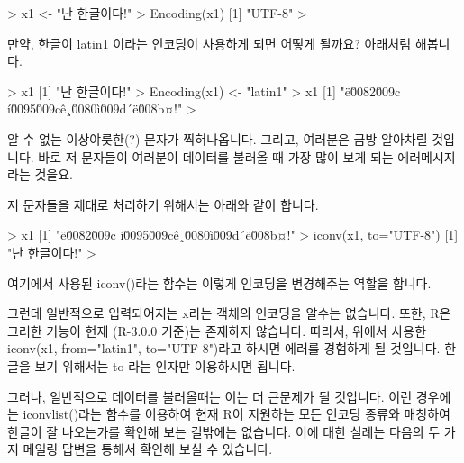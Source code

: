 \begin{Schunk}
\begin{Soutput}
> x1 <- "난 한글이다!"
> Encoding(x1)
[1] "UTF-8"
> 
\end{Soutput}
\end{Schunk}

만약, 한글이 latin1 이라는 인코딩이 사용하게 되면 어떻게 될까요? 
아래처럼 해봅니다.

\begin{Schunk}
\begin{Soutput}
> x1
[1] "난 한글이다!"
> Encoding(x1) <- "latin1"
> x1
[1] "ë\u0082\u009c í\u0095\u009cê¸\u0080ì\u009d´ë\u008b¤!"
> 
\end{Soutput}
\end{Schunk}

알 수 없는 이상야릇한(?) 문자가 찍혀나옵니다. 
그리고, 여러분은 금방 알아차릴 것입니다.
바로 저 문자들이 여러분이 데이터를 불러올 때 가장 많이 보게 되는 에러메시지라는 것을요.

저 문자들을 제대로 처리하기 위해서는 아래와 같이 합니다. 
\begin{Schunk}
\begin{Soutput}
> x1
[1] "ë\u0082\u009c í\u0095\u009cê¸\u0080ì\u009d´ë\u008b¤!"
> iconv(x1, to="UTF-8")
[1] "난 한글이다!"
> 
\end{Soutput}
\end{Schunk}

여기에서 사용된 iconv()라는 함수는 이렇게 인코딩을 변경해주는 역할을 합니다. 

그런데 일반적으로 입력되어지는 x라는 객체의 인코딩을 알수는 없습니다.
또한, R은 그러한 기능이 현재 (R-3.0.0 기준)는 존재하지 않습니다.
따라서, 위에서 사용한 iconv(x1, from="latin1", to="UTF-8")라고 하시면 에러를 경험하게 될 것입니다.
한글을 보기 위해서는 to 라는 인자만 이용하시면 됩니다.

그러나, 일반적으로 데이터를 불러올때는 이는 더 큰문제가 될 것입니다.
이런 경우에는 iconvlist()라는 함수를 이용하여 현재 R이 지원하는 모든 인코딩 종류와 매칭하여 한글이 잘 나오는가를 확인해 보는 길밖에는 없습니다.
이에 대한 실례는 다음의 두 가지 메일링 답변을 통해서 확인해 보실 수 있습니다. 

